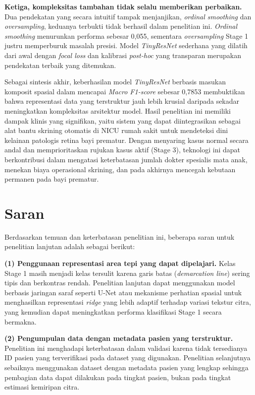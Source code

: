 \textbf{Ketiga, kompleksitas tambahan tidak selalu memberikan perbaikan.} Dua pendekatan
yang secara intuitif tampak menjanjikan, \textit{ordinal smoothing} dan \textit{oversampling}, keduanya
terbukti tidak berhasil dalam penelitian ini. \textit{Ordinal smoothing} menurunkan performa
sebesar 0,055, sementara \textit{oversampling} Stage 1 justru memperburuk masalah presisi.
Model \textit{TinyResNet} sederhana yang dilatih dari awal dengan \textit{focal loss} dan
kalibrasi \textit{post-hoc} yang transparan merupakan pendekatan terbaik yang ditemukan.

Sebagai sintesis akhir, keberhasilan model \textit{TinyResNet} berbasis masukan komposit spasial dalam mencapai \textit{Macro F1-score} sebesar 0,7853 membuktikan bahwa representasi data yang terstruktur jauh lebih krusial daripada sekadar meningkatkan kompleksitas arsitektur model. Hasil penelitian ini memiliki dampak klinis yang signifikan, yaitu sistem yang dapat diintegrasikan sebagai alat bantu skrining otomatis di NICU rumah sakit untuk mendeteksi dini kelainan patologis retina bayi prematur. Dengan menyaring kasus normal secara andal dan memprioritaskan rujukan kasus aktif (Stage 3), teknologi ini dapat berkontribusi dalam mengatasi keterbatasan jumlah dokter spesialis mata anak, menekan biaya operasional skrining, dan pada akhirnya mencegah kebutaan permanen pada bayi prematur.

\section{Saran}

Berdasarkan temuan dan keterbatasan penelitian ini, beberapa saran untuk penelitian lanjutan
adalah sebagai berikut:

\textbf{(1) Penggunaan representasi area tepi yang dapat dipelajari.}
Kelas Stage 1 masih menjadi kelas tersulit karena garis batas (\textit{demarcation line})
sering tipis dan berkontras rendah. Penelitian lanjutan dapat menggunakan model berbasis
jaringan saraf seperti U-Net \citep{Ronneberger2015} atau mekanisme perhatian spasial untuk
menghasilkan representasi \textit{ridge} yang lebih adaptif terhadap variasi tekstur citra,
yang kemudian dapat meningkatkan performa klasifikasi Stage 1 secara bermakna.

\textbf{(2) Pengumpulan data dengan metadata pasien yang terstruktur.} Penelitian ini
menghadapi keterbatasan dalam validasi karena tidak tersedianya ID pasien yang terverifikasi
pada dataset yang digunakan. Penelitian selanjutnya sebaiknya menggunakan dataset dengan
metadata pasien yang lengkap sehingga pembagian data dapat dilakukan pada tingkat pasien,
bukan pada tingkat estimasi kemiripan citra.

